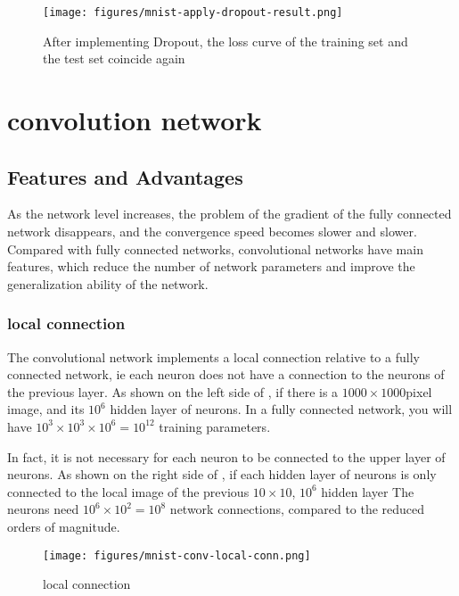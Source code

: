 \begin{content}
\begin{content}
\begin{figure}[H]
\centering
\texttt{[image: figures/mnist-apply-dropout-result.png]}
\caption{After implementing Dropout, the loss curve of the training set and the test set coincide again}
 \label{fig:mnist-apply-dropout-result}
\end{figure}

\end{content}

\section{convolution network}

\begin{content}

\subsection{Features and Advantages}

As the network level increases, the problem of the gradient of the fully connected network disappears, and the convergence speed becomes slower and slower. Compared with fully connected networks, convolutional networks have  main features, which reduce the number of network parameters and improve the generalization ability of the network.

\subsubsection{local connection}

The convolutional network implements a local connection relative to a fully connected network, ie each neuron does not have a connection to the neurons of the previous layer. As shown on the left side of , if there is a $1000\times 1000 $pixel image, and its $10^6$ hidden layer of neurons. In a fully connected network, you will have $10^3\times 10^3 \times 10^6 = 10^{12} $ training parameters.

In fact, it is not necessary for each neuron to be connected to the upper layer of neurons. As shown on the right side of , if each hidden layer of neurons is only connected to the local image of the previous $10\times 10 $, $10^6 $ hidden layer The neurons need $10^6\times 10^2 = 10^8$ network connections, compared to the reduced  orders of magnitude.

\begin{figure}[H]
\centering
\texttt{[image: figures/mnist-conv-local-conn.png]}
\caption{local connection}
 \label{fig:mnist-conv-local-conn}
\end{figure}


\end{content}
\end{content}
